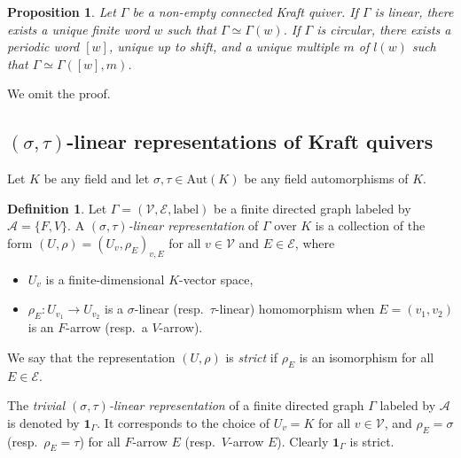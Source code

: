 \documentclass[12pt]{amsart}
\newtheorem{proposition}[theorem]{Proposition}
\theoremstyle{definition}
\newtheorem{definition}[theorem]{Definition}
\newcommand{\<}{\langle}   %
\renewcommand{\>}{\rangle} %
\begin{document}
\begin{proposition}\label{WordOfKraftQuiver}
    Let $\Gamma$ be a non-empty connected Kraft quiver. If $\Gamma$ is linear, there exists a unique finite word $w$ such that $\Gamma \simeq \Gamma(w)$. If $\Gamma$ is circular, there exists a periodic word $[w]$, unique up to shift, and a unique multiple $m$ of $l(w)$ such that $\Gamma \simeq \Gamma([w],m)$. 
\end{proposition}

We omit the proof.

\subsection{$(\sigma,\tau)$-linear representations of Kraft quivers}

Let $K$ be any field and let $\sigma,\tau \in \mathrm{Aut}(K)$ be any field automorphisms of $K$. 

\begin{definition}\label{DefinitionSigmaLinearRepresentation}
    Let $\Gamma = (\mathcal V, \mathcal E, \mathrm{label})$ be a finite directed graph labeled by $\mathcal A = \{F,V\}$. A \textit{$(\sigma,\tau)$-linear representation} of $\Gamma$ over $K$ is a collection of the form $(U,\rho) = (U_v,\rho_E)_{v,E}$ for all $v \in \mathcal V$ and $E \in \mathcal E$, where 
    \begin{itemize}
        \item $U_v$ is a finite-dimensional $K$-vector space,
        \item $\rho_E: U_{v_1} \rightarrow U_{v_2}$ is a $\sigma$-linear (resp.~$\tau$-linear) homomorphism when $E = (v_1,v_2)$ is an $F$-arrow (resp.~a $V$-arrow).
    \end{itemize}
    We say that the representation $(U,\rho)$ is \textit{strict} if $\rho_E$ is an isomorphism for all $E \in \mathcal E$.
\end{definition}

The \textit{trivial $(\sigma,\tau)$-linear representation} of a finite directed graph $\Gamma$ labeled by $\mathcal A$ is denoted by $\mathbf 1_{\Gamma}$. It corresponds to the choice of $U_v = K$ for all $v\in \mathcal V$, and $\rho_E = \sigma$ (resp.~$\rho_E = \tau$) for all $F$-arrow $E$ (resp.~$V$-arrow $E$). Clearly $\mathbf 1_{\Gamma}$ is strict. 
\end{document}
